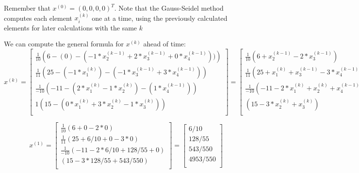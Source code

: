 Remember that $x^{(0)} = (0, 0, 0, 0)^T$. Note that the Gauss-Seidel method computes each element $x_i^{(k)}$ one at a time, using the previously calculated elements for later calculations with the same $k$

We can compute the general formula for $x^{(k)}$ ahead of time:
\begin{equation*}
    x^{(k)} = \begin{bmatrix}
        \frac{1}{10} \left( 6 - (0) - (-1*x^{(k-1)}_2 + 2*x^{(k-1)}_3 + 0*x^{(k-1)}_4)) \right) \\
        \frac{1}{11} \left( 25 - (-1*x^{(k)}_1) - (-1*x^{(k-1)}_3 + 3*x^{(k-1)}_4) \right) \\
        \frac{1}{-10} \left( -11 - (2*x^{(k)}_1 - 1*x^{(k)}_2) - (1*x^{(k-1)}_4) \right) \\
        1 \left( 15 - (0*x^{(k)}_1 + 3*x^{(k)}_2 - 1*x^{(k)}_3) \right) \\
    \end{bmatrix}
    = \begin{bmatrix}
        \frac{1}{10} \left( 6 + x^{(k-1)}_2 - 2*x^{(k-1)}_3 \right) \\
        \frac{1}{11} \left( 25 + x^{(k)}_1 + x^{(k-1)}_3 - 3*x^{(k-1)}_4 \right) \\
        \frac{1}{-10} \left( -11 - 2*x^{(k)}_1 + x^{(k)}_2 + x^{(k-1)}_4 \right) \\
        \left( 15 - 3*x^{(k)}_2 + x^{(k)}_3 \right) \\
    \end{bmatrix}
\end{equation*}

\begin{equation*}
    x^{(1)} = \begin{bmatrix}
        \frac{1}{10} \left( 6 + 0 - 2*0 \right) \\
        \frac{1}{11} \left( 25 + 6/10 + 0 - 3*0 \right) \\
        \frac{1}{-10} \left( -11 - 2*6/10 + 128/55 + 0 \right) \\
        \left( 15 - 3*128/55 + 543/550 \right) \\
    \end{bmatrix}
    = \begin{bmatrix}
        6 / 10 \\
        128 / 55 \\
        543 / 550 \\
        4953 / 550 \\
    \end{bmatrix}
\end{equation*}

